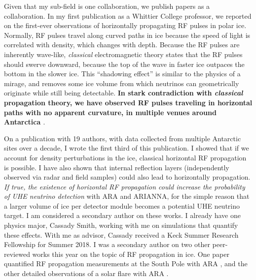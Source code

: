 \documentclass[../../main.tex]{subfiles}
\begin{document}
Given that my sub-field is one collaboration, we publish papers as a collaboration.  In my first publication as a Whittier College professor, we reported on the first-ever observations of horizontally propagating RF pulses in polar ice.  Normally, RF pulses travel along curved paths in ice because the speed of light is correlated with density, which changes with depth.  Because the RF pulses are inherently wave-like, \textit{classical} electromagnetic theory states that the RF pulses should swerve downward, because the top of the wave in faster ice outpaces the bottom in the slower ice.  This ``shadowing effect'' is similar to the physics of a mirage, and removes some ice volume from which neutrinos can geometrically originate while still being detectable.  \textbf{In stark contradiction with \textit{classical} propagation theory, we have observed RF pulses traveling in horizontal paths with no apparent curvature, in multiple venues around Antarctica \cite{horizPaper}}.  \\ \hspace{0.1cm}

On a publication with 19 authors, with data collected from multiple Antarctic sites over a decade, I wrote the first third of this publication.  I showed that if we account for density perturbations in the ice, classical horizontal RF propagation is possible.  I have also shown that internal reflection layers (independently observed via radar and field samples) could also lead to horizontally propagation.  \textit{If true, the existence of horizontal RF propagation could increase the probability of UHE neutrino detection} with ARA and ARIANNA, for the simple reason that a larger volume of ice per detector module becomes a potential UHE neutrino target. I am considered a secondary author on these works. I already have one physics major, Cassady Smith, working with me on simulations that quantify these effects.  With me as advisor, Cassady received a Keck Summer Research Fellowship for Summer 2018.  I was a secondary author on two other peer-reviewed works this year on the topic of RF propagation in ice.  One paper quantified RF propagation measurements at the South Pole with ARA \cite{dielectric}, and the other detailed observations of a solar flare with ARA \cite{flare}.
\end{document}
